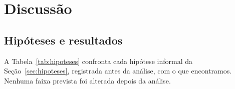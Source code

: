 
\providecommand{\apreencher}[1]{\textbf{[a preencher: #1]}}

\section{Discussão}
\label{sec:discussao}

\subsection{Hipóteses e resultados}

A Tabela~\ref{tab:hipoteses} confronta cada hipótese informal da Seção~\ref{sec:hipoteses},
registrada antes da análise, com o que encontramos. Nenhuma faixa prevista foi alterada depois
da análise.

